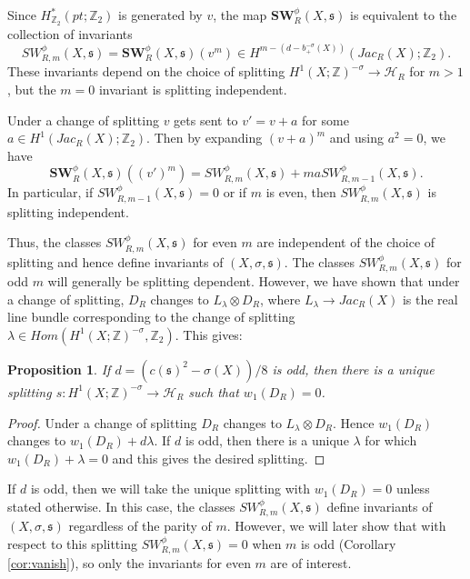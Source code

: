 \documentclass{amsart}
\newtheorem{proposition}[theorem]{Proposition}
\theoremstyle{definition}
\theoremstyle{remark}
\numberwithin{equation}{section}
\begin{document}
Since $H^*_{\mathbb{Z}_2}(pt ; \mathbb{Z}_2)$ is generated by $v$, the map $\mathbf{SW}^\phi_R(X , \mathfrak{s})$ is equivalent to the collection of invariants
\[
SW_{R,m}^\phi(X ,\mathfrak{s}) = \mathbf{SW}_R^\phi(X,\mathfrak{s})(v^m) \in H^{m - (d-b_+^{-\sigma}(X))}( Jac_R(X) ; \mathbb{Z}_2).
\]
These invariants depend on the choice of splitting $H^1(X ; \mathbb{Z})^{-\sigma} \to \mathcal{H}_R$ for $m > 1$, but the $m=0$ invariant is splitting independent.

Under a change of splitting $v$ gets sent to $v' = v + a$ for some $a \in H^1( Jac_R(X) ; \mathbb{Z}_2)$. Then by expanding $(v+a)^m$ and using $a^2 = 0$, we have
\[
\mathbf{SW}_R^\phi(X , \mathfrak{s})((v')^m ) = SW_{R,m}^\phi(X,\mathfrak{s}) + ma SW_{R,m-1}^\phi(X,\mathfrak{s}).
\]
In particular, if $SW^\phi_{R,m-1}(X , \mathfrak{s}) = 0$ or if $m$ is even, then $SW^\phi_{R,m}(X,\mathfrak{s})$ is splitting independent.

Thus, the classes $SW^\phi_{R,m}(X,\mathfrak{s})$ for even $m$ are independent of the choice of splitting and hence define invariants of $(X , \sigma , \mathfrak{s})$. The classes $SW^\phi_{R,m}(X,\mathfrak{s})$ for odd $m$ will generally be splitting dependent. However, we have shown that under a change of splitting, $D_R$ changes to $L_\lambda \otimes D_R$, where $L_\lambda \to Jac_R(X)$ is the real line bundle corresponding to the change of splitting $\lambda \in Hom( H^1(X ; \mathbb{Z})^{-\sigma} , \mathbb{Z}_2)$. This gives:

\begin{proposition}\label{prop:doddsplit}
If $d = (c(\mathfrak{s})^2 - \sigma(X))/8$ is odd, then there is a unique splitting $s : H^1(X ; \mathbb{Z})^{-\sigma} \to \mathcal{H}_R$ such that $w_1(D_R) = 0$.
\end{proposition}
\begin{proof}
Under a change of splitting $D_R$ changes to $L_\lambda \otimes D_R$. Hence $w_1(D_R)$ changes to $w_1(D_R) + d \lambda$. If $d$ is odd, then there is a unique $\lambda$ for which $w_1(D_R) + \lambda = 0$ and this gives the desired splitting.
\end{proof}

If $d$ is odd, then we will take the unique splitting with $w_1(D_R) = 0$ unless stated otherwise. In this case, the classes $SW^\phi_{R,m}(X,\mathfrak{s})$ define invariants of $(X , \sigma , \mathfrak{s})$ regardless of the parity of $m$. However, we will later show that with respect to this splitting $SW^\phi_{R,m}(X,\mathfrak{s}) = 0$ when $m$ is odd (Corollary \ref{cor:vanish}), so only the invariants for even $m$ are of interest.
\end{document}
